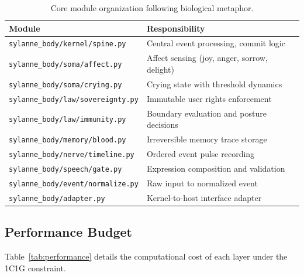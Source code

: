 \documentclass[10pt,twocolumn]{article}
\begin{document}
\begin{table}[h]
\centering
\scriptsize
\begin{tabular}{lp{4.5cm}}
\toprule
\textbf{Module} & \textbf{Responsibility} \\
\midrule
\texttt{sylanne\_body/kernel/spine.py} & Central event processing, commit logic \\
\texttt{sylanne\_body/soma/affect.py} & Affect sensing (joy, anger, sorrow, delight) \\
\texttt{sylanne\_body/soma/crying.py} & Crying state with threshold dynamics \\
\texttt{sylanne\_body/law/sovereignty.py} & Immutable user rights enforcement \\
\texttt{sylanne\_body/law/immunity.py} & Boundary evaluation and posture decisions \\
\texttt{sylanne\_body/memory/blood.py} & Irreversible memory trace storage \\
\texttt{sylanne\_body/nerve/timeline.py} & Ordered event pulse recording \\
\texttt{sylanne\_body/speech/gate.py} & Expression composition and validation \\
\texttt{sylanne\_body/event/normalize.py} & Raw input to normalized event \\
\texttt{sylanne\_body/adapter.py} & Kernel-to-host interface adapter \\
\bottomrule
\end{tabular}
\caption{Core module organization following biological metaphor.}
\label{tab:modules}
\end{table}

\subsection{Performance Budget}

Table~\ref{tab:performance} details the computational cost of each layer under the 1C1G constraint.
\end{document}
